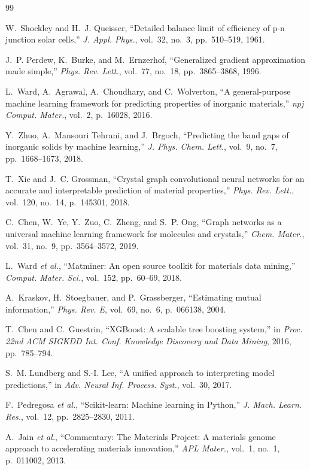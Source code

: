 \documentclass[conference]{IEEEtran}
\begin{document}
\begin{thebibliography}{99}

W.~Shockley and H.~J. Queisser, ``Detailed balance limit of efficiency of p-n junction solar cells,'' \emph{J. Appl. Phys.}, vol.~32, no.~3, pp.~510--519, 1961.

J.~P. Perdew, K.~Burke, and M.~Ernzerhof, ``Generalized gradient approximation made simple,'' \emph{Phys. Rev. Lett.}, vol.~77, no.~18, pp.~3865--3868, 1996.

L.~Ward, A.~Agrawal, A.~Choudhary, and C.~Wolverton, ``A general-purpose machine learning framework for predicting properties of inorganic materials,'' \emph{npj Comput. Mater.}, vol.~2, p.~16028, 2016.

Y.~Zhuo, A.~Mansouri Tehrani, and J.~Brgoch, ``Predicting the band gaps of inorganic solids by machine learning,'' \emph{J. Phys. Chem. Lett.}, vol.~9, no.~7, pp.~1668--1673, 2018.

T.~Xie and J.~C. Grossman, ``Crystal graph convolutional neural networks for an accurate and interpretable prediction of material properties,'' \emph{Phys. Rev. Lett.}, vol.~120, no.~14, p.~145301, 2018.

C.~Chen, W.~Ye, Y.~Zuo, C.~Zheng, and S.~P. Ong, ``Graph networks as a universal machine learning framework for molecules and crystals,'' \emph{Chem. Mater.}, vol.~31, no.~9, pp.~3564--3572, 2019.

L.~Ward \emph{et al.}, ``Matminer: An open source toolkit for materials data mining,'' \emph{Comput. Mater. Sci.}, vol.~152, pp.~60--69, 2018.

A.~Kraskov, H.~Stoegbauer, and P.~Grassberger, ``Estimating mutual information,'' \emph{Phys. Rev. E}, vol.~69, no.~6, p.~066138, 2004.

T.~Chen and C.~Guestrin, ``XGBoost: A scalable tree boosting system,'' in \emph{Proc. 22nd ACM SIGKDD Int. Conf. Knowledge Discovery and Data Mining}, 2016, pp.~785--794.

S.~M. Lundberg and S.-I. Lee, ``A unified approach to interpreting model predictions,'' in \emph{Adv. Neural Inf. Process. Syst.}, vol.~30, 2017.

F.~Pedregosa \emph{et al.}, ``Scikit-learn: Machine learning in Python,'' \emph{J. Mach. Learn. Res.}, vol.~12, pp.~2825--2830, 2011.

A.~Jain \emph{et al.}, ``Commentary: The Materials Project: A materials genome approach to accelerating materials innovation,'' \emph{APL Mater.}, vol.~1, no.~1, p.~011002, 2013.

\end{thebibliography}
\end{document}
